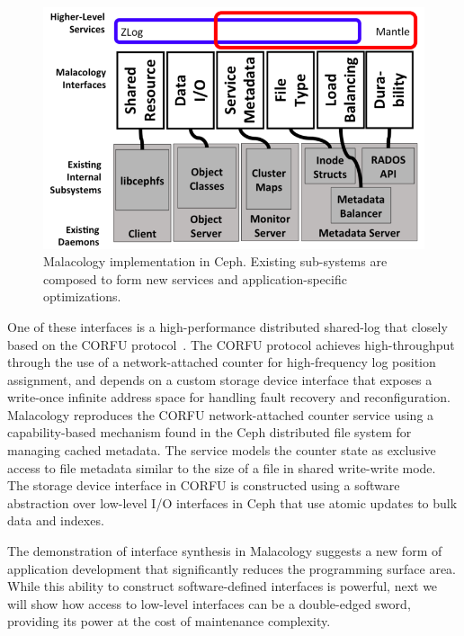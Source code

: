 \begin{figure}[th]
\centering
\includegraphics[width=1.0\linewidth]{implementation-overview.png}
\caption{Malacology implementation in Ceph. Existing sub-systems are composed
    to form new services and application-specific optimizations.}
\label{fig:malacology}
\end{figure}

One of these interfaces is a high-performance distributed shared-log that
closely based on the CORFU protocol~\cite{balakrishnan:nsdi12}. The CORFU
protocol achieves high-throughput through the use of a network-attached
counter for high-frequency log position assignment, and depends on a custom
storage device interface that exposes a write-once infinite address space for
handling fault recovery and reconfiguration. Malacology reproduces the CORFU
network-attached counter service using a capability-based mechanism found in
the Ceph distributed file system for managing cached metadata. The service
models the counter state as exclusive access to file metadata similar to the
size of a file in shared write-write mode. The storage device interface in
CORFU is constructed using a software abstraction over low-level I/O
interfaces in Ceph that use atomic updates to bulk data and indexes.

The demonstration of interface synthesis in Malacology suggests a new form of
application development that significantly reduces the programming surface
area. While this ability to construct software-defined interfaces is powerful,
next we will show how access to low-level interfaces can be a double-edged
sword, providing its power at the cost of maintenance complexity.
